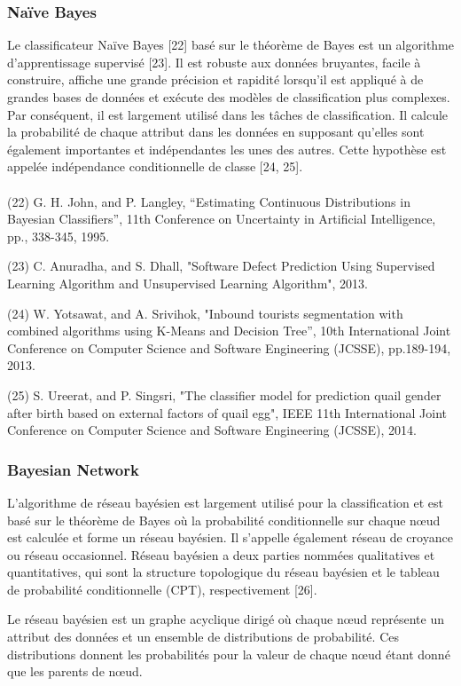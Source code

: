 \subsubsection{Naïve Bayes}
Le classificateur Naïve Bayes [22] basé sur le théorème de Bayes est un algorithme d'apprentissage supervisé [23]. Il est robuste aux données bruyantes, facile à construire, affiche une grande précision et rapidité lorsqu'il est appliqué à de grandes bases de données et exécute des modèles de classification plus complexes. Par conséquent, il est largement utilisé dans les tâches de classification. Il calcule la probabilité de chaque attribut dans les données en supposant qu'elles sont également importantes et indépendantes les unes des autres. Cette hypothèse est appelée indépendance conditionnelle de classe [24, 25].
\\
\\
(22) G. H. John, and P. Langley, “Estimating Continuous Distributions in Bayesian Classifiers”, 11th Conference on Uncertainty in Artificial Intelligence, pp., 338-345, 1995.

(23) C. Anuradha, and S. Dhall, "Software Defect Prediction Using Supervised Learning Algorithm and Unsupervised Learning Algorithm", 2013.

(24) W. Yotsawat, and A. Srivihok, "Inbound tourists segmentation with combined algorithms using K-Means and Decision Tree”, 10th International Joint Conference on Computer Science and Software Engineering (JCSSE), pp.189-194, 2013.

(25) S. Ureerat, and P. Singsri, "The classifier model for prediction quail gender after birth based on external factors of quail egg", IEEE 11th International Joint Conference on Computer Science and Software Engineering (JCSSE), 2014.

\subsubsection{Bayesian Network}

L'algorithme de réseau bayésien est largement utilisé pour la classification et est basé sur le théorème de Bayes où la probabilité conditionnelle sur chaque nœud est calculée et forme un réseau bayésien. Il s'appelle également réseau de croyance ou réseau occasionnel. Réseau bayésien a deux parties nommées qualitatives et quantitatives, qui sont la structure topologique du réseau bayésien et le tableau de probabilité conditionnelle (CPT), respectivement [26].

Le réseau bayésien est un graphe acyclique dirigé où chaque nœud représente un attribut des données et un ensemble de distributions de probabilité. Ces distributions donnent les probabilités pour la valeur de chaque nœud étant donné que les parents de nœud.

